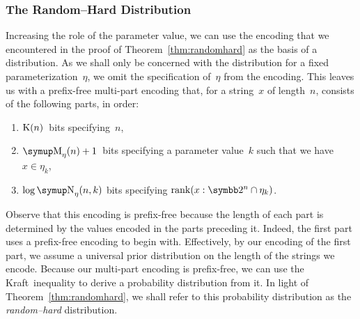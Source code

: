 \subsubsection{The Random--Hard Distribution}
Increasing the role of the parameter value, we can use the encoding that we encountered in the proof of Theorem~\ref{thm:randomhard} as the basis of a distribution.
As we shall only be concerned with the distribution for a fixed parameterization~$\eta$, we omit the specification of~$\eta$ from the encoding.
This leaves us with a prefix-free multi-part encoding that, for a string~$x$ of length~$n$, consists of the following parts, in order:
\begin{enumerate}
\item $\operatorname{K}(n)$~bits specifying~$n$,
\item $\upM_\eta(n) + 1$~bits specifying a parameter value~$k$ such that we have $x \in \eta_k$,
\item $\log \upN_\eta(n, k)$ bits specifying $\rank(x : \binary^n \cap \eta_k)$.
\end{enumerate}
Observe that this encoding is prefix-free because the length of each part is determined by the values encoded in the parts preceding it.
Indeed, the first part uses a prefix-free encoding to begin with.
Effectively, by our encoding of the first part, we assume a universal prior distribution on the length of the strings we encode.
Because our multi-part encoding is prefix-free, we can use the Kraft~inequality to derive a probability distribution from it.
In light of Theorem~\ref{thm:randomhard}, we shall refer to this probability distribution as the \emph{random--hard} distribution.

